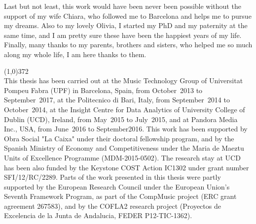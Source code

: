 Last but not least, this work would have been never been possible without the support of my wife Chiara, who followed me to Barcelona and helps me to pursue my dreams. Also to my lovely Olivia, I started my PhD and my paternity at the same time, and I am pretty sure these have been the happiest years of my life. Finally, many thanks to my parents, brothers and sisters, who helped me so much along my whole life, I am here thanks to them.

\vspace*{\fill}

\line(1,0){372}\\
\footnotesize
This thesis has been carried out at the Music Technology Group of Universitat Pompeu Fabra (UPF) in Barcelona, Spain, from October~2013 to September~2017, at the Politecnico di Bari, Italy, from September~2014 to October~2014, at the Insight Centre for Data Analytics of University College of Dublin (UCD), Ireland, from May~2015 to July~2015, and at Pandora Media Inc., USA, from June~2016 to September2016. This work has been supported by Obra Social "La Caixa" under their doctoral fellowship program, and by the Spanish Ministry of Economy and Competitiveness under the Maria de Maeztu Units of Excellence Programme (MDM-2015-0502). The research stay at UCD has been also funded by the Keystone COST Action IC1302 under grant number SFI/12/RC/2289. Parts of the work presented in this thesis were partly supported by the European Research Council under the European Union's Seventh Framework Program, as part of the CompMusic project (ERC grant agreement 267583), and by the COFLA2 research project (Proyectos de Excelencia de la Junta de Andalucia, FEDER P12-TIC-1362).
\normalsize